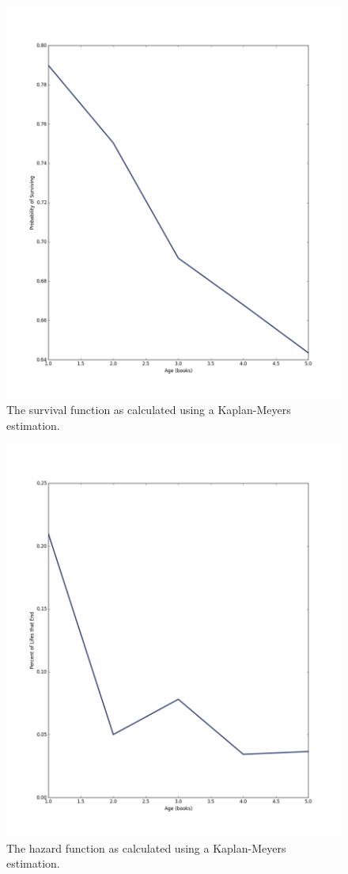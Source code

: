 \documentclass{article}
\begin{document}
\begin{figure}[ht!]
\centering
\includegraphics[width=\textwidth]{survivalfunction.png}
\caption{The survival function as calculated using a Kaplan-Meyers estimation.}
\end{figure}
\begin{figure}[ht!]
\centering
\includegraphics[width=\textwidth]{hazardfunction.png}
\caption{The hazard function as calculated using a Kaplan-Meyers estimation.}
\end{figure}
\end{document}
